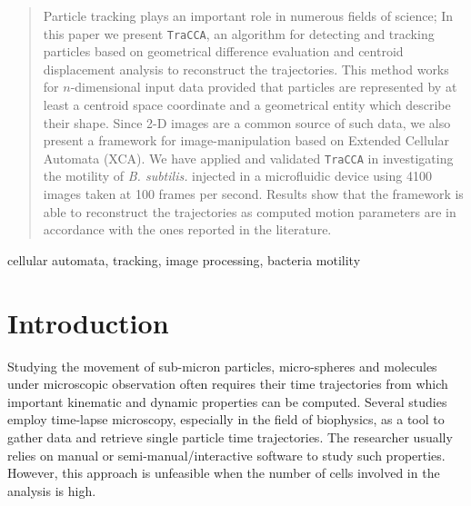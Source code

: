 \documentclass[conference]{IEEEtran}
\begin{document}
\maketitle


\begin{abstract}
Particle tracking plays an important role in numerous fields of science; In this paper we present \texttt{TraCCA}, an algorithm for detecting and tracking particles based on geometrical difference evaluation and centroid displacement analysis to reconstruct the trajectories. 
This method works for $n$-dimensional input data provided that particles are represented by at least a centroid space coordinate and a geometrical entity which describe their shape. 
Since 2-D images are a common source of such data, we also present a framework for image-manipulation based on Extended Cellular Automata (XCA).
We have applied and validated \texttt{TraCCA} in investigating the motility of \textit{B. subtilis.} injected in a microfluidic device using 4100 images taken at 100 frames per second. 
Results show that the framework is able to reconstruct the trajectories as computed motion parameters  are in accordance with the ones reported in the literature.   


\end{abstract}

\begin{IEEEkeywords}
cellular automata, tracking, image processing, bacteria motility
\end{IEEEkeywords}






%
\IEEEpeerreviewmaketitle

\section{Introduction}
Studying the movement of sub-micron particles, micro-spheres and molecules under microscopic observation often requires their time trajectories from which important kinematic and dynamic properties can be computed. 
Several studies employ time-lapse microscopy, especially in the field of biophysics, as a tool to gather data and retrieve single particle time trajectories. The researcher usually relies on manual or semi-manual/interactive software to study such properties. However, this approach is unfeasible when the number of cells involved in the analysis is high.
\end{document}
